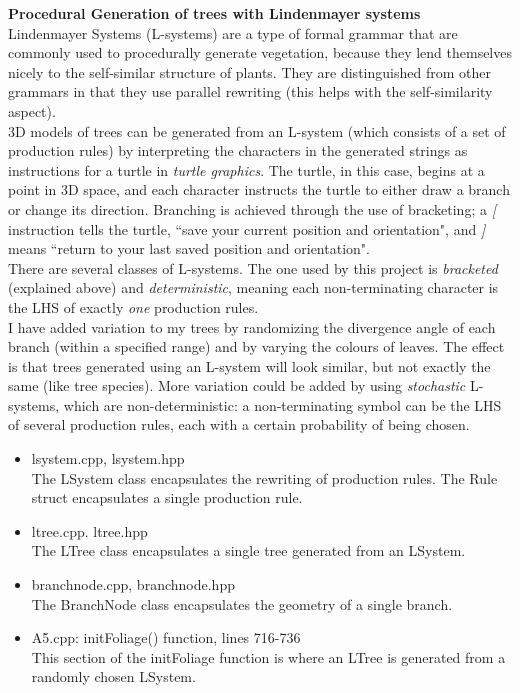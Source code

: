 \documentclass{article}
\begin{document}
	\large\noindent\textbf{Procedural Generation of trees with Lindenmayer systems}
	\normalsize
	\\

	Lindenmayer Systems (L-systems) are a type of formal grammar that are commonly used to procedurally generate vegetation, because they lend themselves nicely to the self-similar structure of plants. They are distinguished from other grammars in that they use parallel rewriting (this helps with the self-similarity aspect).
	\\

	3D models of trees can be generated from an L-system (which consists of a set of production rules) by interpreting the characters in the generated strings as instructions for a turtle in \textit{turtle graphics}. The turtle, in this case, begins at a point in 3D space, and each character instructs the turtle to either draw a branch or change its direction. Branching is achieved through the use of bracketing; a \textit{[} instruction tells the turtle, ``save your current position and orientation", and \textit{]} means ``return to your last saved position and orientation".
	\\

	There are several classes of L-systems. The one used by this project is \textit{bracketed} (explained above) and \textit{deterministic}, meaning each non-terminating character is the LHS of exactly \textit{one} production rules.
	\\

	I have added variation to my trees by randomizing the divergence angle of each branch (within a specified range) and by varying the colours of leaves. The effect is that trees generated using an L-system will look similar, but not exactly the same (like tree species). More variation could be added by using \textit{stochastic} L-systems, which are non-deterministic: a non-terminating symbol can be the LHS of several production rules, each with a certain probability of being chosen.
	\\

	\begin{itemize}
	\item\noindent lsystem.cpp, lsystem.hpp \\
	The LSystem class encapsulates the rewriting of production rules. The Rule struct encapsulates a single production rule.
	\item ltree.cpp. ltree.hpp \\
	The LTree class encapsulates a single tree generated from an LSystem.
	\item branchnode.cpp, branchnode.hpp \\
	The BranchNode class encapsulates the geometry of a single branch.
	\item A5.cpp: initFoliage() function, lines 716-736 \\
	This section of the initFoliage function is where an LTree is generated from a randomly chosen LSystem.
	\end{itemize}
\end{document}
